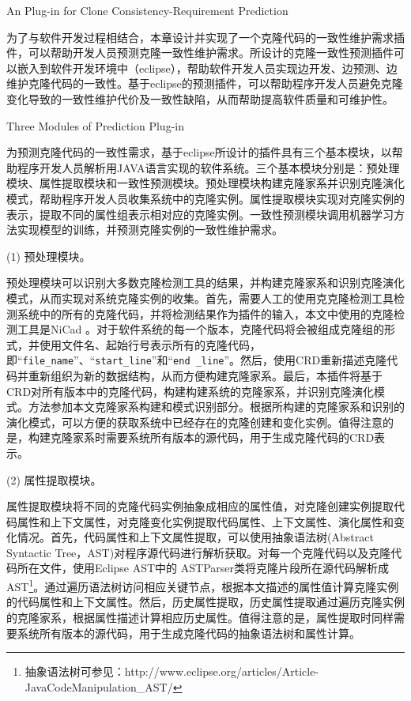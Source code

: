 
{An Plug-in for Clone Consistency-Requirement Prediction}

为了与软件开发过程相结合，本章设计并实现了一个克隆代码的一致性维护需求插件，可以帮助开发人员预测克隆一致性维护需求。所设计的克隆一致性预测插件可以嵌入到软件开发环境中（eclipse），帮助软件开发人员实现边开发、边预测、边维护克隆代码的一致性。基于eclipse的预测插件，可以帮助程序开发人员避免克隆变化导致的一致性维护代价及一致性缺陷，从而帮助提高软件质量和可维护性。

{Three Modules of Prediction Plug-in }

为预测克隆代码的一致性需求，基于eclipse所设计的插件具有三个基本模块，以帮助程序开发人员解析用JAVA语言实现的软件系统。三个基本模块分别是：预处理模块、属性提取模块和一致性预测模块。预处理模块构建克隆家系并识别克隆演化模式，帮助程序开发人员收集系统中的克隆实例。属性提取模块实现对克隆实例的表示，提取不同的属性组表示相对应的克隆实例。一致性预测模块调用机器学习方法实现模型的训练，并预测克隆实例的一致性维护需求。

(1) 预处理模块。

预处理模块可以识别大多数克隆检测工具的结果，并构建克隆家系和识别克隆演化模式，从而实现对系统克隆实例的收集。首先，需要人工的使用克克隆检测工具检测系统中的所有的克隆代码，并将检测结果作为插件的输入，本文中使用的克隆检测工具是NiCad 。对于软件系统的每一个版本，克隆代码将会被组成克隆组的形式，并使用文件名、起始行号表示所有的克隆代码，即“{\tt file\_name}”、“{\tt start\_line}”和“{\tt end \_line}”。然后，使用CRD重新描述克隆代码并重新组织为新的数据结构，从而方便构建克隆家系。最后，本插件将基于CRD对所有版本中的克隆代码，构建构建系统的克隆家系，并识别克隆演化模式。方法参加本文克隆家系构建和模式识别部分。根据所构建的克隆家系和识别的演化模式，可以方便的获取系统中已经存在的克隆创建和变化实例。值得注意的是，构建克隆家系时需要系统所有版本的源代码，用于生成克隆代码的CRD表示。

(2) 属性提取模块。

属性提取模块将不同的克隆代码实例抽象成相应的属性值，对克隆创建实例提取代码属性和上下文属性，对克隆变化实例提取代码属性、上下文属性、演化属性和变化情况。首先，代码属性和上下文属性提取，可以使用抽象语法树(Abstract Syntactic Tree，AST)对程序源代码进行解析获取。对每一个克隆代码以及克隆代码所在文件，使用Eclipse AST中的 ASTParser类将克隆片段所在源代码解析成AST\footnote{抽象语法树可参见：http://www.eclipse.org/articles/Article-JavaCodeManipulation\_AST/}。通过遍历语法树访问相应关键节点，根据本文描述的属性值计算克隆实例的代码属性和上下文属性。然后，历史属性提取，历史属性提取通过遍历克隆实例的克隆家系，根据属性描述计算相应历史属性。值得注意的是，属性提取时同样需要系统所有版本的源代码，用于生成克隆代码的抽象语法树和属性计算。


